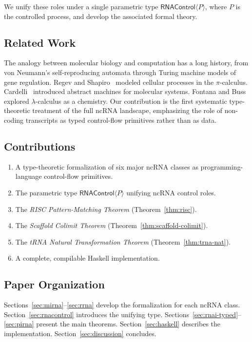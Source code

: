\documentclass[12pt,a4paper]{article}
\theoremstyle{definition}
\newcommand{\RNAType}{\mathsf{RNAControl}}
\begin{document}
We unify these roles under a single parametric type
$\RNAType\langle P\rangle$, where $P$ is the controlled process, and
develop the associated formal theory.

\subsection{Related Work}

The analogy between molecular biology and computation has a long
history, from von Neumann's self-reproducing automata through Turing
machine models of gene regulation.  Regev and
Shapiro~\cite{regev2001} modeled cellular processes in the
$\pi$-calculus.  Cardelli~\cite{cardelli2005} introduced abstract
machines for molecular systems.  Fontana and Buss~\cite{fontana1994}
explored $\lambda$-calculus as a chemistry.  Our contribution is
the first systematic type-theoretic treatment of the full ncRNA
landscape, emphasizing the role of non-coding transcripts as typed
control-flow primitives rather than as data.

\subsection{Contributions}

\begin{enumerate}[label=(\arabic*)]
  \item A type-theoretic formalization of six major ncRNA classes as
    programming-language control-flow primitives.
  \item The parametric type $\RNAType\langle P\rangle$ unifying ncRNA
    control roles.
  \item The \emph{RISC Pattern-Matching Theorem} (Theorem~\ref{thm:risc}).
  \item The \emph{Scaffold Colimit Theorem} (Theorem~\ref{thm:scaffold-colimit}).
  \item The \emph{tRNA Natural Transformation Theorem} (Theorem~\ref{thm:trna-nat}).
  \item A complete, compilable Haskell implementation.
\end{enumerate}

\subsection{Paper Organization}

Sections~\ref{sec:mirna}--\ref{sec:rrna} develop the formalization for
each ncRNA class.  Section~\ref{sec:rnacontrol} introduces the unifying
type.  Sections~\ref{sec:rnai-typed}--\ref{sec:pirna} present the main
theorems.  Section~\ref{sec:haskell} describes the implementation.
Section~\ref{sec:discussion} concludes.
\end{document}
